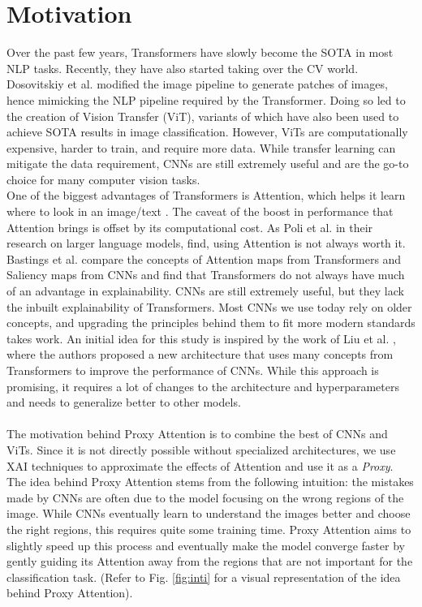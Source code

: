 \documentclass[a4paper,11pt,openright]{book}
\begin{document}
\section{Motivation}
Over the past few years, Transformers have slowly become the SOTA in most NLP tasks. Recently, they have also started taking over the CV world. Dosovitskiy et al. \cite{dosovitskiyImageWorth16x162021}  modified the image pipeline to generate patches of images, hence mimicking the NLP pipeline required by the Transformer. Doing so led to the creation of Vision Transfer (ViT), variants of which have also been used to achieve SOTA results in image classification. However, ViTs are computationally expensive, harder to train, and require more data. While transfer learning can mitigate the data requirement, CNNs are still extremely useful and are the go-to choice for many computer vision tasks.\\
One of the biggest advantages of Transformers is Attention, which helps it learn where to look in an image/text \cite{vaswaniAttentionAllYou2017}. The caveat of the boost in performance that Attention brings is offset by its computational cost. As Poli et al. \cite{poliHyenaHierarchyLarger2023} in their research on larger language models, find, using Attention is not always worth it. Bastings et al. \cite{bastingsElephantInterpretabilityRoom2020} compare the concepts of Attention maps from Transformers and Saliency maps from CNNs and find that Transformers do not always have much of an advantage in explainability. CNNs are still extremely useful, but they lack the inbuilt explainability of Transformers. Most CNNs we use today rely on older concepts, and upgrading the principles behind them to fit more modern standards takes work. An initial idea for this study is inspired by the work of Liu et al. \cite{liuConvNet2020s2022}, where the authors proposed a new architecture that uses many concepts from Transformers to improve the performance of CNNs. While this approach is promising, it requires a lot of changes to the architecture and hyperparameters and needs to generalize better to other models. \\\\
The motivation behind Proxy Attention is to combine the best of CNNs and ViTs. Since it is not directly possible without specialized architectures, we use XAI techniques to approximate the effects of Attention and use it as a \textit{Proxy}. The idea behind Proxy Attention stems from the following intuition: the mistakes made by CNNs are often due to the model focusing on the wrong regions of the image. While CNNs eventually learn to understand the images better and choose the right regions, this requires quite some training time. Proxy Attention aims to slightly speed up this process and eventually make the model converge faster by gently guiding its Attention away from the regions that are not important for the classification task. (Refer to Fig. \ref{fig:inti} for a visual representation of the idea behind Proxy Attention).\\
\end{document}
